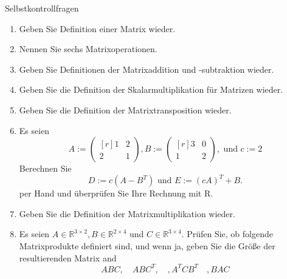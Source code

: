 \documentclass[
  8pt,
  ignorenonframetext,
]{beamer}
\begin{document}
\begin{frame}{Selbstkontrollfragen}
\protect\hypertarget{selbstkontrollfragen}{}
\footnotesize
\begin{enumerate}
\item Geben Sie Definition einer Matrix wieder.
\item Nennen Sie sechs Matrixoperationen.
\item Geben Sie Definitionen der Matrixaddition und -subtraktion wieder.
\item Geben Sie die Definition der Skalarmultiplikation für Matrizen wieder.
\item Geben Sie die Definition der Matrixtransposition wieder.
\item Es seien
\begin{equation}
A :=
\begin{pmatrix*}[r]
1 & 2 \\
2 & 1
\end{pmatrix*},
B :=
\begin{pmatrix*}[r]
3 & 0 \\
1 & 2
\end{pmatrix*},
\mbox{ und }
c := 2
\end{equation}
Berechnen Sie
\begin{equation}
D := c\left(A - B^T\right)
\mbox{ und }
E := \left(cA\right)^T + B.
\end{equation}
per Hand und überprüfen Sie Ihre Rechnung mit R.


\item Geben Sie die Definition der Matrixmultiplikation wieder.
\item Es seien $A \in \mathbb{R}^{3 \times 2}, B \in \mathbb{R}^{2\times 4}$
und $C \in \mathbb{R}^{3 \times 4}$. Prüfen Sie, ob folgende Matrixprodukte
definiert sind, und wenn ja, geben Sie die Größe der resultierenden Matrix and
\begin{equation}
ABC, \quad ABC^T, \quad, A^TCB^T \quad, BAC
\end{equation}

\end{enumerate}
\end{frame}
\end{document}
